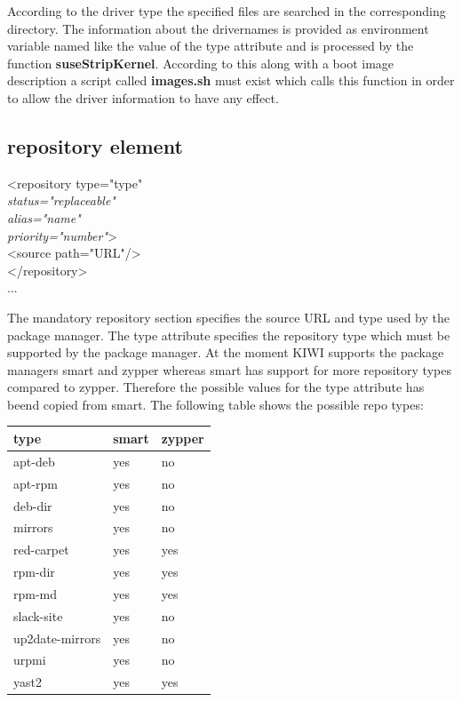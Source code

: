 According to the driver type the specified files are searched in
the corresponding directory. The information about the drivernames
is provided as environment variable named like the value of
the type attribute and is processed by the function
\textbf{suseStripKernel}. According to this along with a boot image
description a script called \textbf{images.sh} must exist which
calls this function in order to allow the driver information to
have any effect.


\subsection{repository element}
\begin{Command}{12cm}
<repository type="type"\\
\hspace*{1cm}\textit{status="replaceable"}\\
\hspace*{1cm}\textit{alias="name"}\\
\hspace*{1cm}\textit{priority="number"}>\\
\hspace*{2cm}<source path="URL"/>\\
</repository>\\
...
\end{Command}

The mandatory repository section specifies the source URL and
type used by the package manager. The type attribute specifies the
repository type which must be supported by the package manager.
At the moment KIWI supports the package managers smart and zypper
whereas smart has support for more repository types compared to
zypper. Therefore the possible values for the type attribute has
beend copied from smart. The following table shows the possible
repo types:\\ 

\begin{tabular}[h]{|p{4cm}|p{2cm}|p{2cm}|}
\hline
\textbf{type} & \textbf{smart} & \textbf{zypper} \\
\hline
apt-deb            & yes & no  \\
apt-rpm            & yes & no  \\
deb-dir            & yes & no  \\
mirrors            & yes & no  \\
red-carpet         & yes & yes \\
rpm-dir            & yes & yes \\
rpm-md             & yes & yes \\ 
slack-site         & yes & no  \\
up2date-mirrors    & yes & no  \\
urpmi              & yes & no  \\
yast2              & yes & yes \\
\hline
\end{tabular}\\

